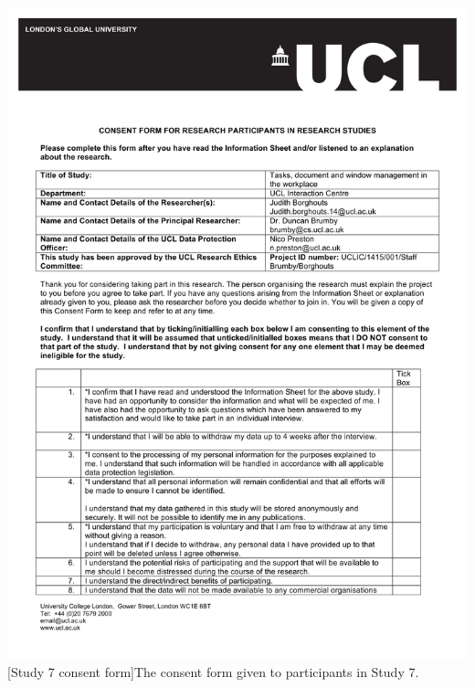 
%
{%
  \centering
  \includegraphics[page=2,scale=.75]{images/appendix/Study7-Consentform.pdf}
  [Study 7 consent form]{The consent form given to participants in Study 7.}
  \par
}

